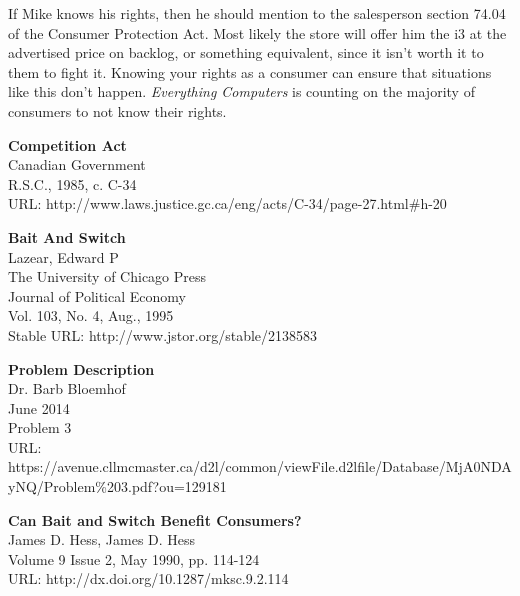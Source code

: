 \documentclass[12pt]{article}
\newcommand\bold[1]{\textbf{#1}}
\newcommand\italics[1]{\textit{#1}}
\begin{document}
If Mike knows his rights, then he should mention to the salesperson section 74.04 of the Consumer Protection Act. Most likely the store will offer him the i3 at the advertised price on backlog, or something equivalent, since it isn't worth it to them to fight it. Knowing your rights as a consumer can ensure that situations like this don't happen. \italics{Everything Computers} is counting on the majority of consumers to not know their rights.

\begin{thebibliography}{1}

\bold{Competition Act}\\
Canadian Government\\
R.S.C., 1985, c. C-34\\
URL: http://www.laws.justice.gc.ca/eng/acts/C-34/page-27.html\#h-20

\bold{Bait And Switch}\\
Lazear, Edward P\\
The University of Chicago Press\\
Journal of Political Economy\\
Vol. 103, No. 4, Aug., 1995\\
Stable URL: http://www.jstor.org/stable/2138583

\bold{Problem Description}\\
Dr. Barb Bloemhof\\
June 2014\\
Problem 3\\
URL: https://avenue.cllmcmaster.ca/d2l/common/viewFile.d2lfile/Database/MjA0NDAyNQ/Problem\%203.pdf?ou=129181

\bold{Can Bait and Switch Benefit Consumers?}\\
James D. Hess, James D. Hess\\
Volume 9 Issue 2, May 1990, pp. 114-124\\
URL: http://dx.doi.org/10.1287/mksc.9.2.114

  \end{thebibliography}
\end{document}

